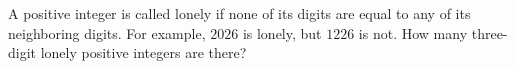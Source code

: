 A positive integer is called lonely if none of its digits are equal to any of its neighboring digits. For example, $2026$ is lonely, but $1226$ is not. How many three-digit lonely positive integers are there?
